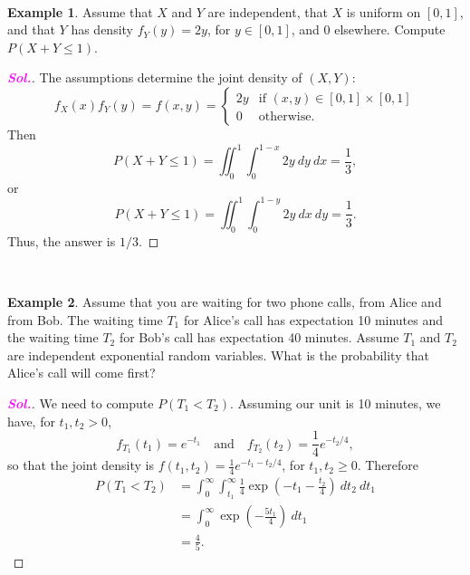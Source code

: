 \documentclass[12pt,a4paper]{article}
\theoremstyle{definition}
\newtheorem{example}{Example}[section]
\theoremstyle{definition}
\theoremstyle{definition}
\theoremstyle{definition}
\theoremstyle{remark}
\theoremstyle{definition}
\newcommand{\dispsty}{\displaystyle}
\newcommand{\sol}{\textcolor{magenta}{\bf \textit{Sol.}}\quad}
\begin{document}
\
\begin{example}
	Assume that $X$ and $Y$ are independent, that $X$ is uniform on $[0,1]$, and that $Y$ has density $f_Y(y)=2y$, for $y\in[0,1]$, and $0$ elsewhere. Compute $P(X+Y\leq 1)$.\begin{proof}[\sol]
		The assumptions determine the joint density of $(X,Y)$: \[
		f_X(x)f_Y(y)=f(x,y)=\begin{cases}
		2y &\text{if $(x,y)\in[0,1]\times[0,1]$}\\
		0 &\text{otherwise}.
		\end{cases}
		\] Then \[
		P(X+Y\leq 1)=\iint_0^1\int_0^{1-x}2y\ dy\ dx=\frac{1}{3},
		\] or \[
		P(X+Y\leq 1)=\iint_0^1\int_0^{1-y}2y\ dx\ dy=\frac{1}{3}.
		\] Thus, the answer is $1/3$.
	\end{proof}
\end{example}
\
\begin{example}
	Assume that you are waiting for two phone calls, from Alice and from Bob. The waiting time $T_1$ for Alice's call has expectation 10 minutes and the waiting time $T_2$ for Bob's call has expectation 40 minutes. Assume $T_1$ and $T_2$ are independent exponential random variables. What is the probability that Alice's call will come first?\begin{proof}[\sol]
		We need to compute $P(T_1<T_2)$. Assuming our unit is 10 minutes, we have, for $t_1,t_2>0$, \[
		f_{T_1}(t_1)=e^{-t_1}\quad\text{and}\quad f_{T_2}(t_2)=\frac{1}{4}e^{-t_2/4},
		\] so that the joint density is $f(t_1,t_2)=\dispsty\frac{1}{4}e^{-t_1-t_2/4}$, for $t_1,t_2\geq 0$. Therefore \begin{align*}
		P(T_1<T_2)&=\int_0^\infty\int_{t_1}^\infty\frac{1}{4}\exp\left(-t_1-\frac{t_2}{4}\right)\ dt_2\ dt_1\\
		&=\int_0^\infty\exp\left(-\frac{5t_1}{4}\right)\ dt_1\\
		&=\frac{4}{5}.
		\end{align*}
	\end{proof}
\end{example}
\
\end{document}
